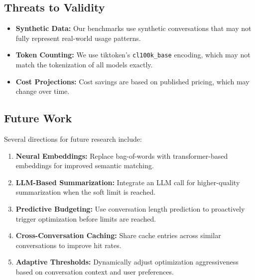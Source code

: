 \subsection{Threats to Validity}

\begin{itemize}[leftmargin=*]
    \item \textbf{Synthetic Data:} Our benchmarks use synthetic conversations that may not fully represent real-world usage patterns.
    \item \textbf{Token Counting:} We use tiktoken's \texttt{cl100k\_base} encoding, which may not match the tokenization of all models exactly.
    \item \textbf{Cost Projections:} Cost savings are based on published pricing, which may change over time.
\end{itemize}

\subsection{Future Work}

Several directions for future research include:

\begin{enumerate}[leftmargin=*]
    \item \textbf{Neural Embeddings:} Replace bag-of-words with transformer-based embeddings for improved semantic matching.
    \item \textbf{LLM-Based Summarization:} Integrate an LLM call for higher-quality summarization when the soft limit is reached.
    \item \textbf{Predictive Budgeting:} Use conversation length prediction to proactively trigger optimization before limits are reached.
    \item \textbf{Cross-Conversation Caching:} Share cache entries across similar conversations to improve hit rates.
    \item \textbf{Adaptive Thresholds:} Dynamically adjust optimization aggressiveness based on conversation context and user preferences.
\end{enumerate}
